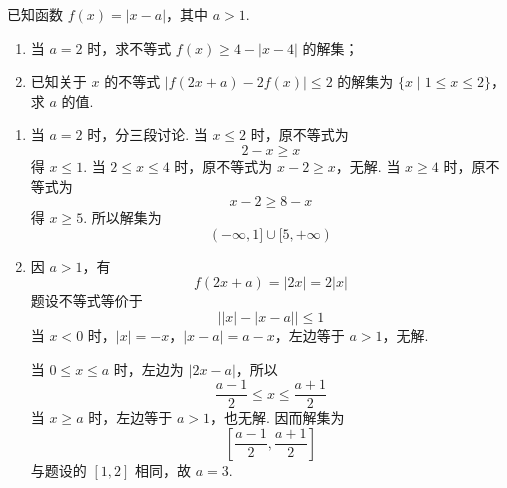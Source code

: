 \begin{problem}
已知函数 \(f(x) = |x - a|\)，其中 \(a > 1\).

\begin{enumerate}
\item 当 \(a = 2\) 时，求不等式 \(f(x) \geqslant 4 - |x - 4|\) 的解集；
\item 已知关于 \(x\) 的不等式 \(\left|f(2x + a) - 2f(x)\right| \leqslant 2\) 的解集为 \(\{x \mid 1 \leqslant x \leqslant 2\}\)，求 \(a\) 的值.
\end{enumerate}
\end{problem}

\begin{solution}
\begin{enumerate}
\item 当 \(a=2\) 时，分三段讨论.
当 \(x\leqslant2\) 时，原不等式为
\[
2-x\geqslant x
\]
得 \(x\leqslant1\). 当 \(2\leqslant x\leqslant4\) 时，原不等式为
\(x-2\geqslant x\)，无解. 当 \(x\geqslant4\) 时，原不等式为
\[
x-2\geqslant8-x
\]
得 \(x\geqslant5\). 所以解集为
\[
(-\infty,1]\cup[5,+\infty)
\]

\item 因 \(a>1\)，有
\[
f(2x+a)=|2x|=2|x|
\]
题设不等式等价于
\[
\left||x|-|x-a|\right|\leqslant1
\]
当 \(x<0\) 时，\(|x|=-x\)，\(|x-a|=a-x\)，左边等于 \(a>1\)，无解.

当 \(0\leqslant x\leqslant a\) 时，左边为 \(|2x-a|\)，所以
\[
\frac{a-1}{2}\leqslant x\leqslant\frac{a+1}{2}
\]
当 \(x\geqslant a\) 时，左边等于 \(a>1\)，也无解. 因而解集为
\[
\left[\frac{a-1}{2},\frac{a+1}{2}\right]
\]
与题设的 \([1,2]\) 相同，故 \(a=3\).
\end{enumerate}
\end{solution}
